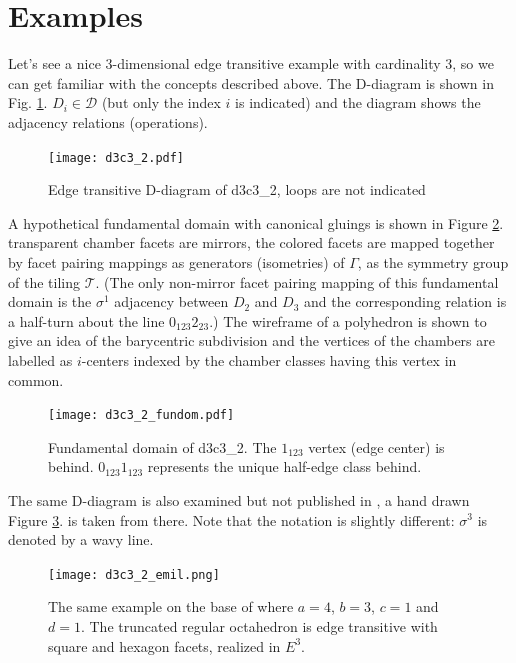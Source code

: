 \documentclass[12pt,a4paper]{article}
\numberwithin{equation}{section}
\theoremstyle{plain}%
\theoremstyle{definition}
\theoremstyle{remark}
\begin{document}
\section{Examples}

Let's see a nice $3$-dimensional edge transitive example with cardinality $3$,
so we can get familiar with the concepts described above. The D-diagram is shown
in Fig.  \ref{fig:d3c3_2}. $D_i\in \mathcal{D}$ (but only the index $i$ is
indicated) and the diagram shows the adjacency relations (operations).

\begin{figure}
  \caption{\label{fig:d3c3_2} Edge transitive D-diagram of d3c3\_2, loops are not indicated}
  \center
  \texttt{[image: d3c3\_2.pdf]}
\end{figure}

A hypothetical fundamental domain with canonical gluings is shown in Figure \ref{fig:d3c3_2_fundom}.
transparent chamber facets are mirrors, the colored facets are mapped together
by facet pairing mappings as generators (isometries) of $\Gamma$, as the
symmetry group of the tiling $\mathcal{T}$. (The only non-mirror facet pairing
mapping of this fundamental domain is the $\sigma^1$ adjacency between $D_2$
and $D_3$ and the corresponding relation is a half-turn about the line
$0_{123}2_{23}$.) The wireframe of a polyhedron is shown to give an idea of the
barycentric subdivision and the vertices of the chambers are labelled as
$i$-centers indexed by the chamber classes having this vertex in common.

\begin{figure}
  \caption{\label{fig:d3c3_2_fundom} Fundamental domain of d3c3\_2. The
  $1_{123}$ vertex (edge center) is behind. $0_{123}1_{123}$ represents the
  unique half-edge class behind.}
  \center
  \texttt{[image: d3c3\_2\_fundom.pdf]}
\end{figure}

The same D-diagram is also examined but not published in \cite{DHM93}, a hand drawn Figure
\ref{fig:d3c3_2_emil}. is taken from there. Note that the notation is slightly
different: $\sigma^3$ is denoted by a wavy line.

\begin{figure}
  \caption{\label{fig:d3c3_2_emil} The same example on the base of
  \cite{DHM93} where $a=4$, $b=3$, $c=1$ and $d=1$. The truncated regular
  octahedron is edge transitive with square and hexagon facets, realized in
  $E^3$.}
  \center
  \texttt{[image: d3c3\_2\_emil.png]}
\end{figure}
\end{document}

